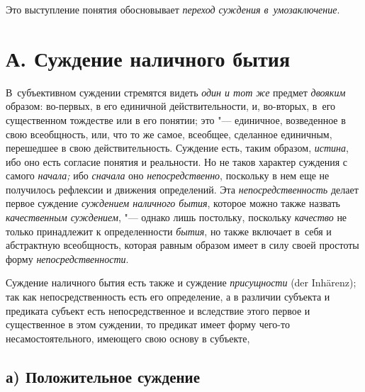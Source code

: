Это выступление понятия обосновывает {\em переход суждения в~умозаключение}.

\section[А. Суждение наличного бытия]{А. Суждение наличного бытия}

В~субъективном суждении стремятся видеть {\em один и тот же} предмет
{\em двояким} образом: во-первых, в его единичной действительности, и,
во-вторых, в~его существенном тождестве или в его понятии; это
"--- единичное, возведенное в свою всеобщность, или, что то же
самое, всеобщее, сделанное единичным, перешедшее в свою действительность.
Суждение есть, таким образом, {\em истина}, ибо оно есть согласие понятия и
реальности. Но не таков характер суждения с самого {\em начала;} ибо
{\em сначала} оно {\em непосредственно}, поскольку в нем еще не получилось
рефлексии и движения определений. Эта {\em непосредственность} делает первое
суждение {\em суждением наличного бытия}, которое можно также назвать {\em
качественным суждением}, "--- однако лишь постольку, поскольку {\em качество}
не только принадлежит к определенности {\em бытия}, но также включает в~себя и
абстрактную всеобщность, которая равным образом имеет в силу своей простоты
форму {\em непосредственности}.

Суждение наличного бытия есть также и суждение {\em присущности} (der
Inhärenz); так как непосредственность есть его определение, а в различии
субъекта и предиката субъект есть непосредственное и вследствие этого первое и
существенное в этом суждении, то предикат имеет форму чего-то
несамостоятельного, имеющего свою основу в субъекте,

\subsection[а) Положительное суждение ]{а) Положительное суждение}


